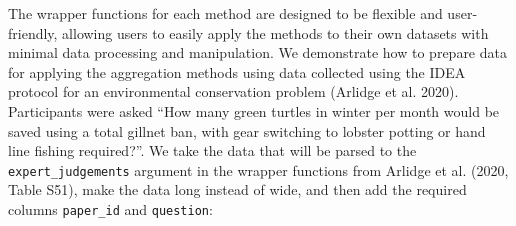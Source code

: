 \documentclass[
  11pt,
  a4paper,
]{article}
\begin{document}
The wrapper functions for each method are designed to be flexible and
user-friendly, allowing users to easily apply the methods to their own
datasets with minimal data processing and manipulation. We demonstrate
how to prepare data for applying the  aggregation methods
using data collected using the IDEA protocol for an environmental
conservation problem (Arlidge et al. 2020). Participants were asked
``How many green turtles in winter per month would be saved using a
total gillnet ban, with gear switching to lobster potting or hand line
fishing required?''. We take the data that will be parsed to the
\texttt{expert\_judgements} argument in the wrapper functions from
Arlidge et al. (2020, Table S51), make the data long instead of wide,
and then add the required columns \texttt{paper\_id} and
\texttt{question}:
\end{document}
